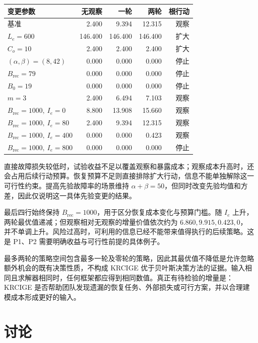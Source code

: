 \documentclass[11pt,a4paper]{ctexart}
\numberwithin{equation}{section}
\theoremstyle{definition}
\theoremstyle{plain}
\begin{document}
\begin{center}
\small
\begin{tabularx}{\textwidth}{>{\raggedright\arraybackslash}Xrrrr}
\toprule
变更参数 & 无观察 & 一轮 & 两轮 & 根行动\\
\midrule
基准 & 2.400 & 9.394 & 12.315 & 观察\\
$L_e=600$ & 146.400 & 146.400 & 146.400 & 扩大\\
$C_o=10$ & 2.400 & 2.400 & 2.400 & 扩大\\
$(\alpha,\beta)=(8,42)$ & 0.000 & 0.000 & 0.000 & 停止\\
$B_{\mathrm{rec}}=79$ & 0.000 & 0.000 & 0.000 & 停止\\
$B_0=19$ & 0.000 & 0.000 & 0.000 & 停止\\
$m=3$ & 2.400 & 6.494 & 7.103 & 观察\\
$B_{\mathrm{rec}}=1000,\ I_e=0$ & 8.800 & 13.908 & 15.660 & 观察\\
$B_{\mathrm{rec}}=1000,\ I_e=80$ & 2.400 & 9.394 & 12.315 & 观察\\
$B_{\mathrm{rec}}=1000,\ I_e=400$ & 0.000 & 0.000 & 0.423 & 观察\\
$B_{\mathrm{rec}}=1000,\ I_e=800$ & 0.000 & 0.000 & 0.000 & 停止\\
\bottomrule
\end{tabularx}
\normalsize
\end{center}

直接故障损失较低时，试验收益不足以覆盖观察和暴露成本；观察成本升高时，还会占用后续行动预算。恢复预算不足则直接排除扩大行动，信息不能单独解除这一可行性约束。提高先验故障率的场景维持 $\alpha+\beta=50$，但同时改变先验均值和方差，因此仅说明这一具体先验变更的结果。

最后四行始终保持 $B_{\mathrm{rec}}=1000$，用于区分恢复成本变化与预算门槛。随 $I_e$ 上升，两轮最优值递减；但观察相对无观察的增量价值依次约为 $6.860,9.915,0.423,0$，并不单调上升。风险过高时，可利用的信息已经不能带来值得执行的后续策略。这是 P1、P2 需要明确收益与可行性前提的具体例子。

最多两轮的策略空间包含最多一轮及零轮的策略，因此其最优值不降低是允许忽略额外机会的既有决策性质，不构成 KRCIGE 优于贝叶斯决策方法的证据。输入相同且求解器相同时，任何框架都应得到相同数值。真正有待检验的增量是：KRCIGE 是否帮助团队发现遗漏的恢复任务、外部损失或可行方案，并以合理建模成本形成更好的输入。

\section{讨论}
\end{document}
